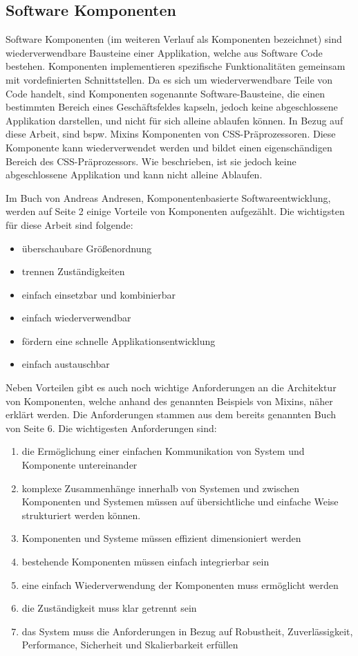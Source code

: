 \subsection{Software Komponenten}
Software Komponenten (im weiteren Verlauf als Komponenten bezeichnet) sind wiederverwendbare Bausteine einer Applikation, welche aus Software Code bestehen. Komponenten implementieren spezifische Funktionalitäten gemeinsam mit vordefinierten Schnittstellen. Da es sich um wiederverwendbare Teile von Code handelt, sind Komponenten sogenannte Software-Bausteine, die einen bestimmten Bereich eines Geschäftsfeldes kapseln, jedoch keine abgeschlossene Applikation darstellen, und nicht für sich alleine ablaufen können. \autocite[1]{Andresen.2003}\newline
In Bezug auf diese Arbeit, sind bspw. Mixins Komponenten von CSS-Präprozessoren. Diese Komponente kann wiederverwendet werden und bildet einen eigenschändigen Bereich des CSS-Präprozessors. Wie beschrieben, ist sie jedoch keine abgeschlossene Applikation und kann nicht alleine Ablaufen.

Im Buch von Andreas Andresen, Komponentenbasierte Softwareentwicklung, \autocite[]{Andresen.2003} werden auf Seite 2 einige Vorteile von Komponenten aufgezählt. Die wichtigsten für diese Arbeit sind folgende:
\begin{itemize}
  \item überschaubare Größenordnung
  \item trennen Zuständigkeiten
  \item einfach einsetzbar und kombinierbar
  \item einfach wiederverwendbar
  \item fördern eine schnelle Applikationsentwicklung
  \item einfach austauschbar
\end{itemize} 
Neben Vorteilen gibt es auch noch wichtige Anforderungen an die Architektur von Komponenten, welche anhand des genannten Beispiels von Mixins, näher erklärt werden. Die Anforderungen stammen aus dem bereits genannten Buch von Seite 6. Die wichtigesten Anforderungen sind: 
\begin{enumerate}
  \item die Ermöglichung  einer einfachen Kommunikation von System und Komponente untereinander
  \item komplexe Zusammenhänge innerhalb von Systemen und zwischen Komponenten und Systemen müssen auf übersichtliche und einfache Weise strukturiert werden können.
  \item Komponenten und Systeme müssen effizient dimensioniert werden
  \item bestehende Komponenten müssen einfach integrierbar sein
  \item eine einfach Wiederverwendung der Komponenten muss ermöglicht werden
  \item die Zuständigkeit muss klar getrennt sein
  \item das System muss die Anforderungen in Bezug auf Robustheit, Zuverlässigkeit, Performance, Sicherheit und Skalierbarkeit erfüllen
\end{enumerate}

